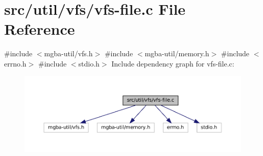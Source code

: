\hypertarget{vfs-file_8c}{}\section{src/util/vfs/vfs-\/file.c File Reference}
\label{vfs-file_8c}
{\ttfamily \#include $<$mgba-\/util/vfs.\+h$>$}\newline
{\ttfamily \#include $<$mgba-\/util/memory.\+h$>$}\newline
{\ttfamily \#include $<$errno.\+h$>$}\newline
{\ttfamily \#include $<$stdio.\+h$>$}\newline
Include dependency graph for vfs-\/file.c\+:
\nopagebreak
\begin{figure}[H]
\begin{center}
\leavevmode
\includegraphics[width=350pt]{vfs-file_8c__incl}
\end{center}
\end{figure}
